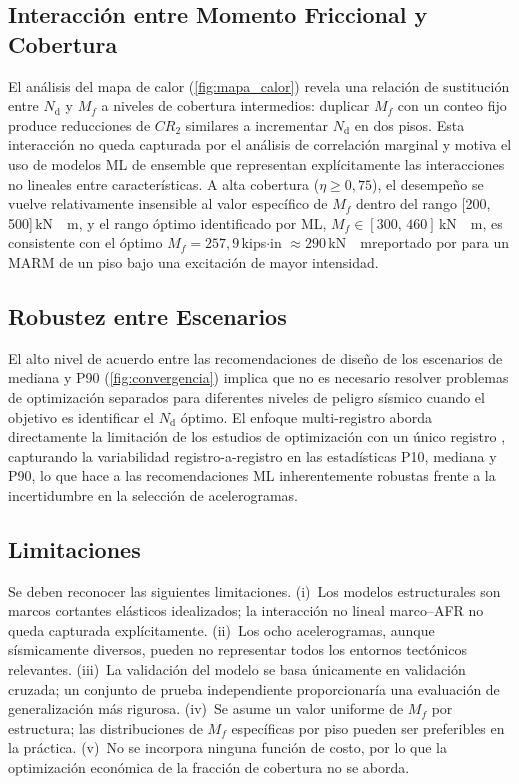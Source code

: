 \documentclass[preprint,12pt,authoryear]{elsarticle}
\newcommand{\nd}{N_{\mathrm{d}}}
\newcommand{\etad}{\eta}
\newcommand{\Mf}{M_{\!f}}
\newcommand{\KM}{\,\si{kN{\cdot}m}}
\begin{document}
\subsection{Interacción entre Momento Friccional y Cobertura}

El análisis del mapa de calor (\cref{fig:mapa_calor}) revela una relación de
sustitución entre $\nd$ y $\Mf$ a niveles de cobertura intermedios: duplicar
$\Mf$ con un conteo fijo produce reducciones de $CR_2$ similares a incrementar
$\nd$ en dos pisos. Esta interacción no queda capturada por el análisis de
correlación marginal y motiva el uso de modelos ML de ensemble que representan
explícitamente las interacciones no lineales entre características. A alta
cobertura ($\etad \geq 0{,}75$), el desempeño se vuelve relativamente insensible
al valor específico de $\Mf$ dentro del rango [200,\,500]\KM, y el rango óptimo
identificado por ML, $\Mf \in [300,\,460]$\KM, es consistente con el óptimo
$\Mf = 257{,}9$\,kips$\cdot$in $\approx 290$\KM reportado por
\citet{Jarrahi2020jbe} para un MARM de un piso bajo una excitación de mayor
intensidad.

\subsection{Robustez entre Escenarios}

El alto nivel de acuerdo entre las recomendaciones de diseño de los escenarios
de mediana y P90 (\cref{fig:convergencia}) implica que no es necesario resolver
problemas de optimización separados para diferentes niveles de peligro sísmico
cuando el objetivo es identificar el $\nd$ óptimo. El enfoque multi-registro
aborda directamente la limitación de los estudios de optimización con un único
registro \citep{Jarrahi2020jbe,Jarrahi2020sdee}, capturando la variabilidad
registro-a-registro en las estadísticas P10, mediana y P90, lo que hace a las
recomendaciones ML inherentemente robustas frente a la incertidumbre en la
selección de acelerogramas.

\subsection{Limitaciones}

Se deben reconocer las siguientes limitaciones. (i)~Los modelos estructurales son
marcos cortantes elásticos idealizados; la interacción no lineal marco--AFR no
queda capturada explícitamente. (ii)~Los ocho acelerogramas, aunque sísmicamente
diversos, pueden no representar todos los entornos tectónicos relevantes.
(iii)~La validación del modelo se basa únicamente en validación cruzada; un
conjunto de prueba independiente proporcionaría una evaluación de generalización
más rigurosa. (iv)~Se asume un valor uniforme de $\Mf$ por estructura; las
distribuciones de $\Mf$ específicas por piso pueden ser preferibles en la
práctica. (v)~No se incorpora ninguna función de costo, por lo que la
optimización económica de la fracción de cobertura no se aborda.
\end{document}
